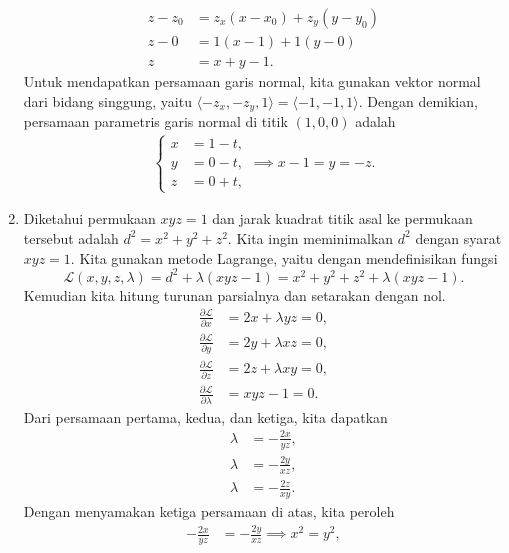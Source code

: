 \documentclass[11pt,a4paper]{article}
\begin{document}
\begin{enumerate}
        \begin{align*}
          z - z_0 & = z_x(x - x_0) + z_y(y - y_0) \\
          z - 0   & = 1(x - 1) + 1(y - 0)         \\
          z       & = x + y - 1.
        \end{align*}
        Untuk mendapatkan persamaan garis normal, kita gunakan vektor normal dari bidang singgung, yaitu $\langle -z_x, -z_y, 1 \rangle = \langle -1, -1, 1 \rangle$. Dengan demikian, persamaan parametris garis normal di titik $(1, 0, 0)$ adalah
        \begin{align*}
          \begin{cases}
            x & = 1 - t, \\
            y & = 0 - t, \\
            z & = 0 + t,
          \end{cases}\implies
          x-1 = y = -z.
        \end{align*}
  \item Diketahui permukaan $xyz = 1$ dan jarak kuadrat titik asal ke permukaan tersebut adalah $d^2 = x^2 + y^2 + z^2$. Kita ingin meminimalkan $d^2$ dengan syarat $xyz = 1$. Kita gunakan metode Lagrange, yaitu dengan mendefinisikan fungsi
        \[
          \mathcal{L}(x, y, z, \lambda) = d^2 + \lambda (xyz - 1) = x^2 + y^2 + z^2 + \lambda (xyz - 1).
        \]
        Kemudian kita hitung turunan parsialnya dan setarakan dengan nol.
        \begin{align*}
          \frac{\partial \mathcal{L}}{\partial x}       & = 2x + \lambda yz = 0, \\
          \frac{\partial \mathcal{L}}{\partial y}       & = 2y + \lambda xz = 0, \\
          \frac{\partial \mathcal{L}}{\partial z}       & = 2z + \lambda xy = 0, \\
          \frac{\partial \mathcal{L}}{\partial \lambda} & = xyz - 1 = 0.
        \end{align*}
        Dari persamaan pertama, kedua, dan ketiga, kita dapatkan
        \begin{align*}
          \lambda & = -\frac{2x}{yz}, \\
          \lambda & = -\frac{2y}{xz}, \\
          \lambda & = -\frac{2z}{xy}.
        \end{align*}
        Dengan menyamakan ketiga persamaan di atas, kita peroleh
        \begin{align*}
          -\frac{2x}{yz} & = -\frac{2y}{xz} \implies x^2 = y^2, \\

\end{align*}
\end{enumerate}
\end{document}
